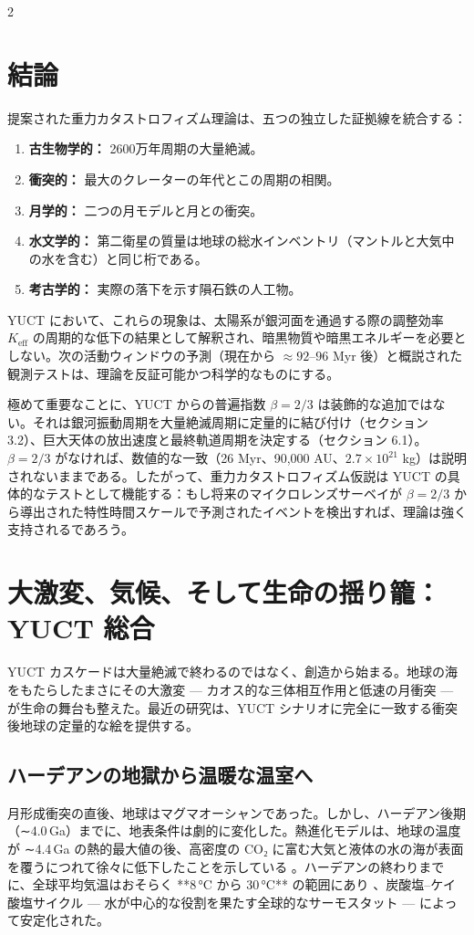 \documentclass[12pt,a4paper]{article}
\begin{document}
	\begin{multicols}{2}
		
		\section{結論}
		提案された重力カタストロフィズム理論は、五つの独立した証拠線を統合する：
		\begin{enumerate}
			\item \textbf{古生物学的：} 2600万年周期の大量絶滅。
			\item \textbf{衝突的：} 最大のクレーターの年代とこの周期の相関。
			\item \textbf{月学的：} 二つの月モデルと月との衝突。
			\item \textbf{水文学的：} 第二衛星の質量は地球の総水インベントリ（マントルと大気中の水を含む）と同じ桁である。
			\item \textbf{考古学的：} 実際の落下を示す隕石鉄の人工物。
		\end{enumerate}
		YUCT において、これらの現象は、太陽系が銀河面を通過する際の調整効率 \(K_{\mathrm{eff}}\) の周期的な低下の結果として解釈され、暗黒物質や暗黒エネルギーを必要としない。次の活動ウィンドウの予測（現在から \(\approx 92\)–\(96\) Myr 後）と概説された観測テストは、理論を反証可能かつ科学的なものにする。
		
		極めて重要なことに、YUCT からの普遍指数 \(\beta = 2/3\) は装飾的な追加ではない。それは銀河振動周期を大量絶滅周期に定量的に結び付け（セクション 3.2）、巨大天体の放出速度と最終軌道周期を決定する（セクション 6.1）。\(\beta = 2/3\) がなければ、数値的な一致（26 Myr、90,000 AU、\(2.7\times10^{21}\) kg）は説明されないままである。したがって、重力カタストロフィズム仮説は YUCT の具体的なテストとして機能する：もし将来のマイクロレンズサーベイが \(\beta = 2/3\) から導出された特性時間スケールで予測されたイベントを検出すれば、理論は強く支持されるであろう。
		
		\section{大激変、気候、そして生命の揺り籠：YUCT 総合}
		YUCT カスケードは大量絶滅で終わるのではなく、創造から始まる。地球の海をもたらしたまさにその大激変 — カオス的な三体相互作用と低速の月衝突 — が生命の舞台も整えた。最近の研究は、YUCT シナリオに完全に一致する衝突後地球の定量的な絵を提供する。
		
		\subsection{ハーデアンの地獄から温暖な温室へ}
		月形成衝突の直後、地球はマグマオーシャンであった。しかし、ハーデアン後期（∼4.0 Ga）までに、地表条件は劇的に変化した。熱進化モデルは、地球の温度が ∼4.4 Ga の熱的最大値の後、高密度の CO₂ に富む大気と液体の水の海が表面を覆うにつれて徐々に低下したことを示している \cite{Korenaga2017}。ハーデアンの終わりまでに、全球平均気温はおそらく **8 °C から 30 °C** の範囲にあり \cite{Charnay2017}、炭酸塩–ケイ酸塩サイクル — 水が中心的な役割を果たす全球的なサーモスタット — によって安定化された。
		

\end{multicols}
\end{document}
